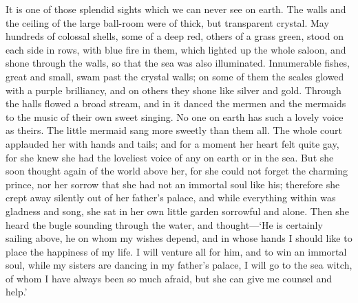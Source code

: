 It is one of those splendid sights which we can never see on earth.
The walls and the ceiling of the large ball-room were of thick, but transparent crystal.
May hundreds of colossal shells, some of a deep red, others of a grass green, stood on each side in rows, with blue fire in them, which lighted up the whole saloon, and shone through the walls, so that the sea was also illuminated.
Innumerable fishes, great and small, swam past the crystal walls; on some of them the scales glowed with a purple brilliancy, and on others they shone like silver and gold.
Through the halls flowed a broad stream, and in it danced the mermen and the mermaids to the music of their own sweet singing.
No one on earth has such a lovely voice as theirs.
The little mermaid sang more sweetly than them all.
The whole court applauded her with hands and tails; and for a moment her heart felt quite gay, for she knew she had the loveliest voice of any on earth or in the sea.
But she soon thought again of the world above her, for she could not forget the charming prince, nor her sorrow that she had not an immortal soul like his; therefore she crept away silently out of her father’s palace, and while everything within was gladness and song, she sat in her own little garden sorrowful and alone.
Then she heard the bugle sounding through the water, and thought—`He is certainly sailing above, he on whom my wishes depend, and in whose hands I should like to place the happiness of my life.
I will venture all for him, and to win an immortal soul, while my sisters are dancing in my father’s palace, I will go to the sea witch, of whom I have always been so much afraid, but she can give me counsel and help.'

